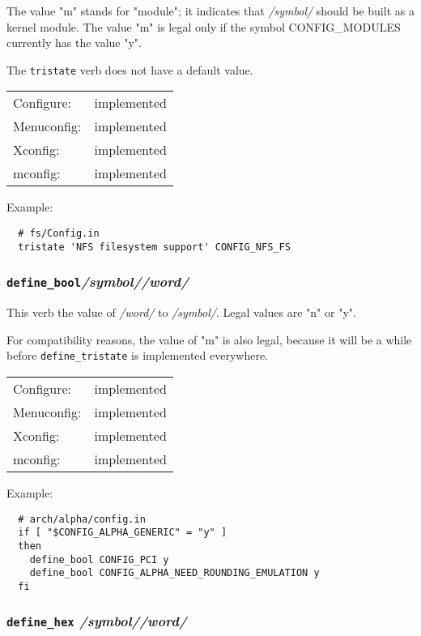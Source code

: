 The value "m" stands for "module"; it indicates that \textit{/symbol/} should
be built as a kernel module.  The value "m" is legal only if the symbol
CONFIG\_MODULES currently has the value "y".

The \texttt{tristate} verb does not have a default value.

\begin{tabular}{ll}
Configure:  &implemented\\
Menuconfig: &implemented\\
Xconfig:    &implemented\\
mconfig:    &implemented\\
\end{tabular}

Example:
{\small\begin{verbatim}
  # fs/Config.in
  tristate 'NFS filesystem support' CONFIG_NFS_FS
\end{verbatim}}



\subsubsection{\texttt{define\_bool}\quad \textit{/symbol/}\quad \textit{/word/}}

This verb the value of \textit{/word/} to \textit{/symbol/}.  
Legal values are "n" or "y".

For compatibility reasons, the value of "m" is also legal, because it
will be a while before \texttt{define\_tristate} is implemented everywhere.

\begin{tabular}{ll}
Configure:  &implemented\\
Menuconfig: &implemented\\
Xconfig:    &implemented\\
mconfig:    &implemented\\
\end{tabular}

Example:
{\small\begin{verbatim}
  # arch/alpha/config.in
  if [ "$CONFIG_ALPHA_GENERIC" = "y" ]
  then
    define_bool CONFIG_PCI y
    define_bool CONFIG_ALPHA_NEED_ROUNDING_EMULATION y
  fi
\end{verbatim}}



\subsubsection{\texttt{define\_hex} \quad\textit{/symbol/}\quad \textit{/word/}}

